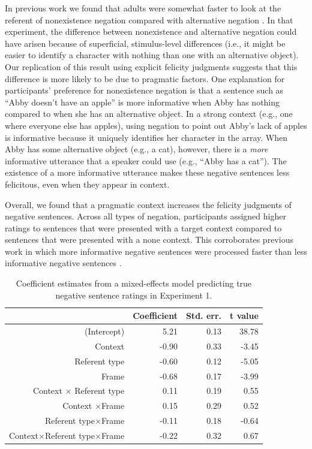 \documentclass[man, noapacite]{apa2}
\begin{document}
In previous work we found that adults were somewhat faster to look at the referent of nonexistence negation compared with alternative negation \cite{nordmeyer2014b}. In that experiment, the difference between nonexistence and alternative negation could have arisen because of superficial, stimulus-level differences (i.e., it might be easier to identify a character with nothing than one with an alternative object). Our replication of this result using explicit felicity judgments suggests that this difference is more likely to be due to pragmatic factors. One explanation for participants' preference for nonexistence negation is that a sentence such as ``Abby doesn't have an apple'' is more informative when Abby has nothing compared to when she has an alternative object. In a strong context (e.g., one where everyone else has apples), using negation to point out Abby's lack of apples is informative because it uniquely identifies her character in the array. When Abby has some alternative object (e.g., a cat), however, there is a \emph{more} informative utterance that a speaker could use (e.g., ``Abby has a cat''). The existence of a more informative utterance makes these negative sentences less felicitous, even when they appear in context.

Overall, we found that a pragmatic context increases the felicity judgments of negative sentences. Across all types of negation, participants assigned higher ratings to sentences that were presented with a target context compared to sentences that were presented with a none context. This corroborates previous work in which more informative negative sentences were processed faster than less informative negative sentences \cite{nordmeyer2014}.

\begin{table}[t]
\caption{\label{tab:s1} Coefficient estimates from a mixed-effects model predicting true negative sentence ratings in Experiment 1.}
\begin{center}
\small\addtolength{\tabcolsep}{-5pt}
\begin{tabular}{rrrr}
 \hline
 & Coefficient & Std. err. & t value \\
 \hline
(Intercept) & 5.21 & 0.13 & 38.78 \\
 Context & -0.90 & 0.33 & -3.45 \\
 Referent type & -0.60 & 0.12 & -5.05 \\
 Frame & -0.68 & 0.17 & -3.99 \\
 Context $\times$ Referent type & 0.11 & 0.19 & 0.55 \\
 Context $\times$Frame & 0.15 & 0.29 & 0.52 \\
 Referent type$\times$Frame & -0.11 & 0.18 & -0.64 \\
 Context$\times$Referent type$\times$Frame & -0.22 & 0.32 & 0.67 \\
  \hline
\end{tabular}
\end{center}
\end{table}
\end{document}
